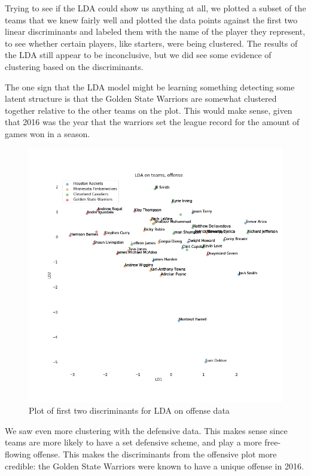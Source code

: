 \documentclass[]{article}
\begin{document}
Trying to see if the LDA could show us anything at all, we plotted a
subset of the teams that we knew fairly well and plotted the data points
against the first two linear discriminants and labeled them with the
name of the player they represent, to see whether certain players, like
starters, were being clustered. The results of the LDA still appear to
be inconclusive, but we did see some evidence of clustering based on the
discriminants.

The one sign that the LDA model might be learning something detecting
some latent structure is that the Golden State Warriors are somewhat
clustered together relative to the other teams on the plot. This would
make sense, given that 2016 was the year that the warriors set the
league record for the amount of games won in a season.

\begin{figure}
\centering
\includegraphics{LDA_players_teams_offense.png}
\caption{Plot of first two discriminants for LDA on offense data}
\end{figure}

We saw even more clustering with the defensive data. This makes sense
since teams are more likely to have a set defensive scheme, and play a
more free-flowing offense. This makes the discriminants from the
offensive plot more credible: the Golden State Warriors were known to
have a unique offense in 2016.
\end{document}
